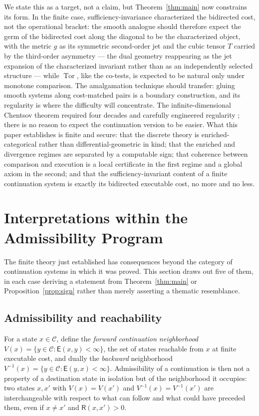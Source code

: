 \documentclass[11pt]{article}
\theoremstyle{remark}
\newcommand{\C}{\mathcal{C}}
\newcommand{\R}{\mathsf{R}}
\newcommand{\E}{\mathsf{E}}
\newcommand{\Tor}{\operatorname{Tor}}
\begin{document}
We state this as a target, not a claim, but
Theorem~\ref{thm:main} now constrains its form. In the finite case,
sufficiency-invariance characterized the bidirected cost, not the
operational bracket: the smooth analogue should therefore expect the
germ of the bidirected cost along the diagonal to be the
characterized object, with the metric $g$ as its symmetric
second-order jet and the cubic tensor $T$ carried by the third-order
asymmetry --- the dual geometry reappearing as the jet expansion of
the characterized invariant rather than as an independently selected
structure --- while $\Tor$, like the co-tests, is expected to be
natural only under monotone comparison. The amalgamation technique
should transfer: gluing smooth systems along cost-matched pairs is a
boundary construction, and its regularity is where the difficulty
will concentrate. The infinite-dimensional Chentsov theorem required
four decades and carefully engineered regularity \cite{ajls}; there
is no reason to expect the continuation version to be easier. What
this paper establishes is finite and secure: that the discrete
theory is enriched-categorical rather than differential-geometric in
kind; that the enriched and divergence regimes are separated by a
computable sign; that coherence between comparison and execution is a
local certificate in the first regime and a global axiom in the
second; and that the sufficiency-invariant content of a finite
continuation system is exactly its bidirected executable cost, no
more and no less.

\section{Interpretations within the Admissibility Program}\label{sec:interp}

The finite theory just established has consequences beyond the
category of continuation systems in which it was proved. This section
draws out five of them, in each case deriving a statement from
Theorem~\ref{thm:main} or Proposition~\ref{prop:sign} rather than
merely asserting a thematic resemblance.

\subsection{Admissibility and reachability}\label{subsec:admissibility}

For a state $x\in\C$, define the \emph{forward continuation
neighborhood} $V(x)=\{y\in\C:\E(x,y)<\infty\}$, the set of states
reachable from $x$ at finite executable cost, and dually the
\emph{backward} neighborhood $V^{-1}(x)=\{y\in\C:\E(y,x)<\infty\}$.
Admissibility of a continuation is then not a property of a
destination state in isolation but of the neighborhood it occupies:
two states $x,x'$ with $V(x)=V(x')$ and $V^{-1}(x)=V^{-1}(x')$ are
interchangeable with respect to what can follow and what could have
preceded them, even if $x\ne x'$ and $\R(x,x')>0$.
\end{document}
